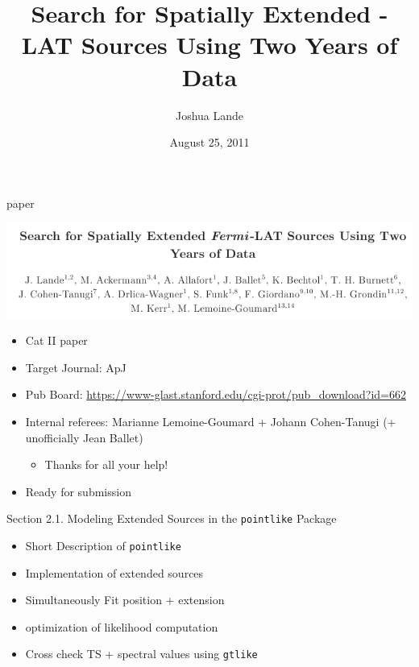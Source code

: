 \documentclass[12pt]{beamer}
\title{Search for Spatially Extended \fermi-LAT Sources Using Two Years of Data}
\author{Joshua Lande}
\institute{SLAC/Stanford}
\date{August 25, 2011}
\begin{document}
\fermititle

\begin{frame}{paper}

  \includegraphics[scale=0.45]{plots/title.png}

  \begin{itemize}
    \item Cat II paper
    \item Target Journal: ApJ
    \item Pub Board: \url{https://www-glast.stanford.edu/cgi-prot/pub_download?id=662}
    \item Internal referees: Marianne Lemoine-Goumard + Johann Cohen-Tanugi (+ unofficially Jean Ballet)
      \begin{itemize}
        \item Thanks for all your help!
      \end{itemize}
    \item Ready for submission
  \end{itemize}
\end{frame}

\begin{frame}{Section 2.1. Modeling Extended Sources in the \texttt{pointlike} Package}
  \begin{itemize}
    \item Short Description of \texttt{pointlike}
    \item Implementation of extended sources
    \item Simultaneously Fit position + extension
    \item optimization of likelihood computation
    \item Cross check TS + spectral values using \texttt{gtlike}
  \end{itemize}
\end{frame}
\end{document}
